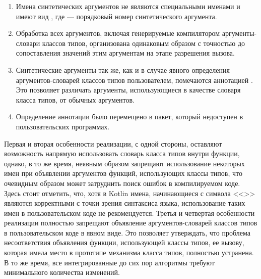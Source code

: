 \begin{enumerate}
    \item Имена синтетических аргументов не являются специальными именами и имеют вид , где  --- порядковый номер синтетического аргумента.
    \item Обработка всех аргументов, включая генерируемые компилятором аргументы-словари классов типов, организована одинаковым образом с точностью до сопоставления значений этим аргументам на этапе разрешения вызова.
    \item Синтетические аргументы так же, как и в случае явного определения аргументов-словарей классов типов пользователем, помечаются аннотацией . Это позволяет различать аргументы, использующиеся в качестве словаря класса типов, от обычных аргументов. 
    \item Определение аннотации  было перемещено в пакет, который недоступен в пользовательских программах. 
\end{enumerate}
Первая и вторая особенности реализации, с одной стороны, оставляют возможность напрямую использовать словарь класса типов внутри функции, однако, в то же время, неявным образом запрещают использование некоторых имен при объявлении аргументов функций, использующих классы типов, что очевидным образом может затруднить поиск ошибок в компилируемом коде. Здесь стоит отметить, что, хотя в Kotlin имена, начинающиеся с символа <<\code{\_}>> являются корректными с точки зрения синтаксиса языка, использование таких имен в пользовательском коде не рекомендуется. Третья и четвертая особенности реализации полностью запрещают объявление аргументов-словарей классов типов в пользовательском коде в явном виде. Это позволяет утверждать, что проблема несоответствия объявления функции, использующей классы типов, ее вызову, которая имела место в прототипе механизма класса типов, полностью устранена. В то же время, все интегрированные до сих пор алгоритмы требуют минимального количества изменений.    


